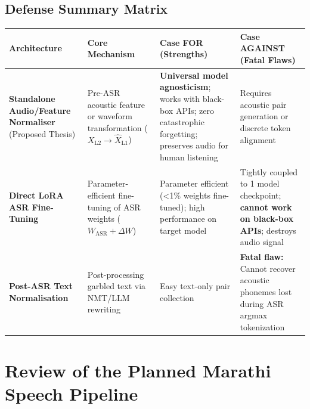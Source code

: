 \documentclass[11pt]{article}
\begin{document}
\subsection{Defense Summary Matrix}
\begin{table}[h!]
\centering
\small
\begin{tabular}{>{\raggedright\arraybackslash}p{3.0cm}>{\raggedright\arraybackslash}p{3.8cm}>{\raggedright\arraybackslash}p{4.2cm}>{\raggedright\arraybackslash}p{4.2cm}}
\toprule
\textbf{Architecture} & \textbf{Core Mechanism} & \textbf{Case FOR (Strengths)} & \textbf{Case AGAINST (Fatal Flaws)} \\
\midrule
\textbf{Standalone Audio/Feature Normaliser} (Proposed Thesis) & Pre-ASR acoustic feature or waveform transformation ($X_{\text{L2}} \to \hat{X}_{\text{L1}}$) & \textbf{Universal model agnosticism}; works with black-box APIs; zero catastrophic forgetting; preserves audio for human listening & Requires acoustic pair generation or discrete token alignment \\
\midrule
\textbf{Direct LoRA ASR Fine-Tuning} & Parameter-efficient fine-tuning of ASR weights ($W_{\text{ASR}} + \Delta W$) & Parameter efficient (<1\% weights fine-tuned); high performance on target model & Tightly coupled to 1 model checkpoint; \textbf{cannot work on black-box APIs}; destroys audio signal \\
\midrule
\textbf{Post-ASR Text Normalisation} & Post-processing garbled text via NMT/LLM rewriting & Easy text-only pair collection & \textbf{Fatal flaw:} Cannot recover acoustic phonemes lost during ASR argmax tokenization \\
\bottomrule
\end{tabular}
\end{table}

\section{Review of the Planned Marathi Speech Pipeline}
\end{document}

